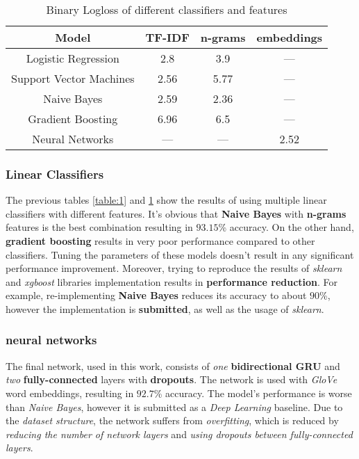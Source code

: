 \documentclass[letterpaper, 10 pt, conference]{ieeeconf}  %
\begin{document}
\begin{table}[h!]
\centering
\begin{tabular}{||c | c | c | c||} 
 \hline
 Model & TF-IDF & n-grams & embeddings \\ [0.5ex] 
 \hline\hline
 Logistic Regression & 2.8 & 3.9 & --- \\ 
 \hline
 Support Vector Machines & 2.56 & 5.77 & --- \\
 \hline
 Naive Bayes & 2.59 & 2.36 & --- \\
 \hline
 Gradient Boosting & 6.96 & 6.5 & --- \\
 \hline
 Neural Networks & --- & --- & 2.52 \\ [1ex] 
 \hline
\end{tabular}
\caption{Binary Logloss of different classifiers and features}
\label{table:2}
\end{table}

\subsubsection{Linear Classifiers}
The previous tables \ref{table:1} and \ref{table:2} show the results of using multiple linear classifiers with different features. It's obvious that \textbf{Naive Bayes} with \textbf{n-grams} features is the best combination resulting in $93.15$\% accuracy. On the other hand, \textbf{gradient boosting} results in very poor performance compared to other classifiers. Tuning the parameters of these models doesn't result in any significant performance improvement. Moreover, trying to reproduce the results of \emph{sklearn} and \emph{xgboost} libraries implementation results in \textbf{performance reduction}. For example, re-implementing \textbf{Naive Bayes} reduces its accuracy to about $90$\%, however the implementation is \textbf{submitted}, as well as the usage of \emph{sklearn}.

\subsubsection{neural networks}
The final network, used in this work, consists of \emph{one} \textbf{bidirectional GRU} and \emph{two} \textbf{fully-connected} layers with \textbf{dropouts}. The network is used with \emph{GloVe} word embeddings, resulting in $92.7$\% accuracy. The model's performance is worse than \emph{Naive Bayes}, however it is submitted as a \emph{Deep Learning} baseline. Due to the \emph{dataset structure}, the network suffers from \emph{overfitting}, which is reduced by \emph{reducing the number of network layers} and \emph{using dropouts between fully-connected layers}.
\end{document}
